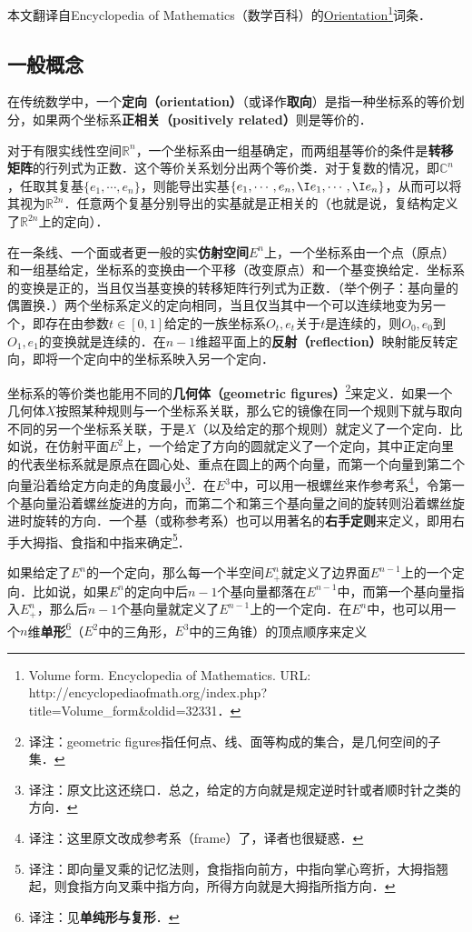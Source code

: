 
本文翻译自Encyclopedia of Mathematics（数学百科）的\href{https://encyclopediaofmath.org/wiki/Volume_form}{Orientation}\footnote{Volume form. Encyclopedia of Mathematics. URL: http://encyclopediaofmath.org/index.php?title=Volume_form&oldid=32331．}词条．

\subsection{一般概念}

在传统数学中，一个\textbf{定向（orientation）}（或译作\textbf{取向}）是指一种坐标系的等价划分，如果两个坐标系\textbf{正相关（positively related）}则是等价的．

对于有限实线性空间$\mathbb{R}^n$，一个坐标系由一组基确定，而两组基等价的条件是\textbf{转移矩阵}的行列式为正数．这个等价关系划分出两个等价类．对于复数的情况，即$\mathbb{C}^n$，任取其复基$\{e_1, \cdots, e_n\}$，则能导出实基$\{e_1, \cdots, e_n, \I e_1, \cdots, \I e_n\}$，从而可以将其视为$\mathbb{R}^{2n}$．任意两个复基分别导出的实基就是正相关的（也就是说，复结构定义了$\mathbb{R}^{2n}$上的定向）．

在一条线、一个面或者更一般的实\textbf{仿射空间}$E^n$上，一个坐标系由一个点（原点）和一组基给定，坐标系的变换由一个平移（改变原点）和一个基变换给定．坐标系的变换是正的，当且仅当基变换的转移矩阵行列式为正数．（举个例子：基向量的偶置换．）两个坐标系定义的定向相同，当且仅当其中一个可以连续地变为另一个，即存在由参数$t\in[0, 1]$给定的一族坐标系$O_t, e_t$关于$t$是连续的，则$O_0, e_0$到$O_1, e_1$的变换就是连续的．在$n-1$维超平面上的\textbf{反射（reflection）}映射能反转定向，即将一个定向中的坐标系映入另一个定向．

坐标系的等价类也能用不同的\textbf{几何体（geometric figures）}\footnote{译注：geometric figures指任何点、线、面等构成的集合，是几何空间的子集．}来定义．如果一个几何体$X$按照某种规则与一个坐标系关联，那么它的镜像在同一个规则下就与取向不同的另一个坐标系关联，于是$X$（以及给定的那个规则）就定义了一个定向．比如说，在仿射平面$E^2$上，一个给定了方向的圆就定义了一个定向，其中正定向里的代表坐标系就是原点在圆心处、重点在圆上的两个向量，而第一个向量到第二个向量沿着给定方向走的角度最小\footnote{译注：原文比这还绕口．总之，给定的方向就是规定逆时针或者顺时针之类的方向．}．在$E^3$中，可以用一根螺丝来作参考系\footnote{译注：这里原文改成参考系（frame）了，译者也很疑惑．}，令第一个基向量沿着螺丝旋进的方向，而第二个和第三个基向量之间的旋转则沿着螺丝旋进时旋转的方向．一个基（或称参考系）也可以用著名的\textbf{右手定则}来定义，即用右手大拇指、食指和中指来确定\footnote{译注：即向量叉乘的记忆法则，食指指向前方，中指向掌心弯折，大拇指翘起，则食指方向叉乘中指方向，所得方向就是大拇指所指方向．}．

如果给定了$E^n$的一个定向，那么每一个半空间$E^n_+$就定义了边界面$E^{n-1}$上的一个定向．比如说，如果$E^n$的定向中后$n-1$个基向量都落在$E^{n-1}$中，而第一个基向量指入$E^n_+$，那么后$n-1$个基向量就定义了$E^{n-1}$上的一个定向．在$E^n$中，也可以用一个$n$维\textbf{单形}\footnote{译注：见\textbf{单纯形与复形}．}（$E^2$中的三角形，$E^3$中的三角锥）的顶点顺序来定义



















